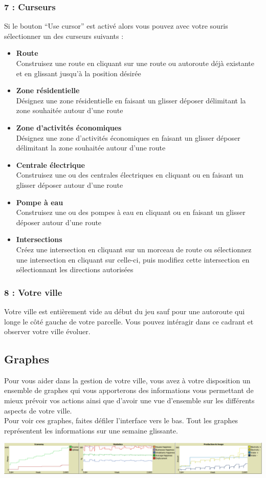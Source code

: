 \documentclass[11pt]{report}
\begin{document}
\subsubsection{7 : Curseurs}
Si le bouton ``Use cursor'' est activé alors vous pouvez avec votre souris sélectionner un des curseurs suivants :
\begin{itemize}
	\item \textbf{Route}\\
	Construisez une route en cliquant sur une route ou autoroute déjà existante et en glissant jusqu'à la position désirée
	\item \textbf{Zone résidentielle}\\
	Désignez une zone résidentielle en faisant un glisser déposer délimitant la zone souhaitée autour d'une route
	\item \textbf{Zone d'activités économiques}\\
	Désignez une zone d'activités économiques en faisant un glisser déposer délimitant la zone souhaitée autour d'une route
	\item \textbf{Centrale électrique}\\
	Construisez une ou des centrales électriques en cliquant ou en faisant un glisser déposer autour d'une route
	\item \textbf{Pompe à eau}\\
	Construisez une ou des pompes à eau en cliquant ou en faisant un glisser déposer autour d'une route
	\item \textbf{Intersections}\\
	Créez une intersection en cliquant sur un morceau de route ou sélectionnez une intersection en cliquant sur celle-ci, puis modifiez cette intersection en sélectionnant les directions autorisées
\end{itemize}

\subsubsection{8 : Votre ville}
Votre ville est entièrement vide au début du jeu sauf pour une autoroute qui longe le côté gauche de votre parcelle.
Vous pouvez intéragir dans ce cadrant et observer votre ville évoluer.



\newpage
\subsection{Graphes}
Pour vous aider dans la gestion de votre ville, vous avez à votre disposition un ensemble de graphes qui vous apporterons des informations vous permettant de mieux prévoir vos actions ainsi que d'avoir une vue d'ensemble sur les différents aspects de votre ville.\\
Pour voir ces graphes, faites défiler l'interface vers le bas.
Tout les graphes représentent les informations sur une semaine glissante.
\begin{center}
	\includegraphics[width=\textwidth]{graphs}
\end{center}
\end{document}
